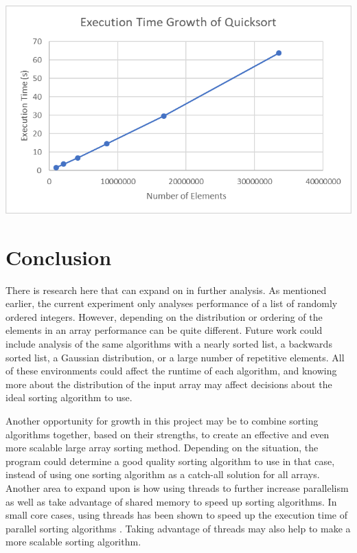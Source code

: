 \documentclass[10pt,letterpaper]{article}
\begin{document}
\begin{multicols}{2}
\begin{center}
\includegraphics[scale=1.2]{quick}
\end{center}

\section{Conclusion}
There is research here that can expand on in further analysis. As mentioned earlier, the current experiment only analyses performance of a list of randomly ordered integers. However, depending on the distribution or ordering of the elements in an array performance can be quite different. Future work could include analysis of the same algorithms with a nearly sorted list, a backwards sorted list, a Gaussian distribution, or a large number of repetitive elements. All of these environments could affect the runtime of each algorithm, and knowing more about the distribution of the input array may affect decisions about the ideal sorting algorithm to use.

Another opportunity for growth in this project may be to combine sorting algorithms together, based on their strengths, to create an effective and even more scalable large array sorting method. Depending on the situation, the program could determine a good quality sorting algorithm to use in that case, instead of using one sorting algorithm as a catch-all solution for all arrays. Another area to expand upon is how using threads to further increase parallelism as well as take advantage of shared memory to speed up sorting algorithms. In small core cases, using threads has been shown to speed up the execution time of parallel sorting algorithms \cite{DBLP:journals/corr/abs-1808-10292}. Taking advantage of threads may also help to make a more scalable sorting algorithm.


\end{multicols}
\end{document}
